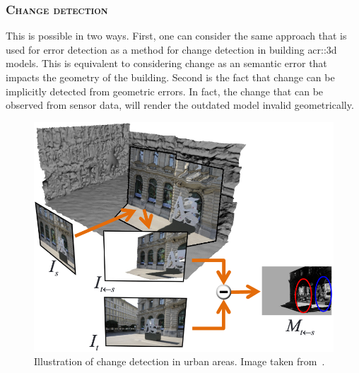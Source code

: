         \subsubsection{\textsc{Change detection}}
            This is possible in two ways.
            First, one can consider the same approach that is used for error detection as a method for change detection in building \gls{acr::3d} models.
            This is equivalent to considering change as an semantic error that impacts the geometry of the building.
            Second is the fact that change can be implicitly detected from geometric errors.
            In fact, the change that can be observed from sensor data, will render the outdated model invalid geometrically.
            \begin{figure}[htpb]
                \centering
                \includegraphics[width=.7\textwidth]{images/introduction/use/change_detection_taneja}
                \caption[
                    Illustration of change detection in urban areas.
                ]{
                    \label{fig::3d_change_detection}
                    Illustration of change detection in urban areas.
                    Image taken from~\parencite{taneja2013city}.
                }
            \end{figure}


